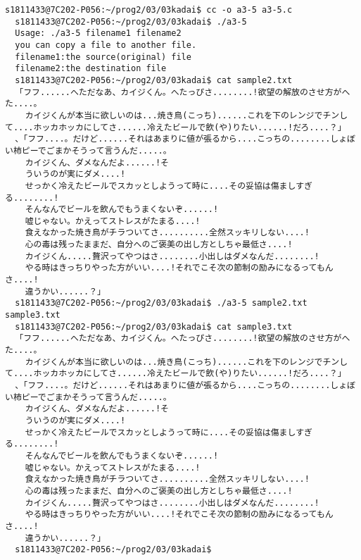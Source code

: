 \documentclass[10pt,a4paper]{jsarticle}
\begin{document}
\begin{lstlisting}[basicstyle=\ttfamily\footnotesize,frame=single]
  s1811433@7C202-P056:~/prog2/03/03kadai$ cc -o a3-5 a3-5.c
  s1811433@7C202-P056:~/prog2/03/03kadai$ ./a3-5
  Usage: ./a3-5 filename1 filename2
  you can copy a file to another file.
  filename1:the source(original) file
  filename2:the destination file
  s1811433@7C202-P056:~/prog2/03/03kadai$ cat sample2.txt
  「フフ......へただなあ、カイジくん。へたっぴさ........!欲望の解放のさせ方がへた....。
    カイジくんが本当に欲しいのは...焼き鳥(こっち)......これを下のレンジでチンして....ホッカホッカにしてさ......冷えたビールで飲(や)りたい......!だろ....？」
  、「フフ....。だけど......それはあまりに値が張るから....こっちの........しょぼい柿ピーでごまかそうって言うんだ.....。
    カイジくん、ダメなんだよ......!そ
    ういうのが実にダメ....!
    せっかく冷えたビールでスカッとしようって時に....その妥協は傷ましすぎる........!
    そんなんでビールを飲んでもうまくないぞ......!
    嘘じゃない。かえってストレスがたまる....!
    食えなかった焼き鳥がチラついてさ..........全然スッキリしない....!
    心の毒は残ったままだ、自分へのご褒美の出し方としちゃ最低さ....!
    カイジくん.....贅沢ってやつはさ........小出しはダメなんだ........!
    やる時はきっちりやった方がいい....!それでこそ次の節制の励みになるってもんさ....!
    違うかい......？」
  s1811433@7C202-P056:~/prog2/03/03kadai$ ./a3-5 sample2.txt sample3.txt
  s1811433@7C202-P056:~/prog2/03/03kadai$ cat sample3.txt
  「フフ......へただなあ、カイジくん。へたっぴさ........!欲望の解放のさせ方がへた....。
    カイジくんが本当に欲しいのは...焼き鳥(こっち)......これを下のレンジでチンして....ホッカホッカにしてさ......冷えたビールで飲(や)りたい......!だろ....？」
  、「フフ....。だけど......それはあまりに値が張るから....こっちの........しょぼい柿ピーでごまかそうって言うんだ.....。
    カイジくん、ダメなんだよ......!そ
    ういうのが実にダメ....!
    せっかく冷えたビールでスカッとしようって時に....その妥協は傷ましすぎる........!
    そんなんでビールを飲んでもうまくないぞ......!
    嘘じゃない。かえってストレスがたまる....!
    食えなかった焼き鳥がチラついてさ..........全然スッキリしない....!
    心の毒は残ったままだ、自分へのご褒美の出し方としちゃ最低さ....!
    カイジくん.....贅沢ってやつはさ........小出しはダメなんだ........!
    やる時はきっちりやった方がいい....!それでこそ次の節制の励みになるってもんさ....!
    違うかい......？」
  s1811433@7C202-P056:~/prog2/03/03kadai$
  
\end{lstlisting}
\end{document}
